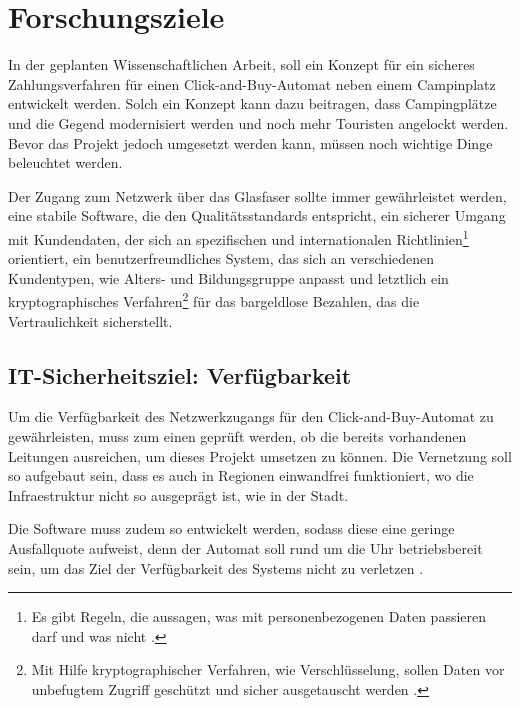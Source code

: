 \section{Forschungsziele}


In der geplanten Wissenschaftlichen Arbeit, soll ein Konzept für ein sicheres Zahlungsverfahren 
für einen Click-and-Buy-Automat neben einem Campinplatz entwickelt werden. Solch ein Konzept kann
dazu beitragen, dass Campingplätze und die Gegend modernisiert werden und noch mehr Touristen 
angelockt werden. Bevor das Projekt jedoch umgesetzt werden kann, müssen noch wichtige Dinge 
beleuchtet werden. 


Der Zugang zum Netzwerk über das Glasfaser sollte immer gewährleistet werden, eine stabile Software, die 
den Qualitätsstandards entspricht, ein sicherer Umgang mit Kundendaten, der sich an spezifischen und
internationalen Richtlinien\footnote{Es gibt Regeln, die aussagen, was mit personenbezogenen Daten passieren
darf und was nicht \cite{refart:DSDS}.} orientiert, ein benutzerfreundliches System, das sich an verschiedenen 
Kundentypen, wie Alters- und Bildungsgruppe anpasst und letztlich ein kryptographisches Verfahren\footnote{Mit
Hilfe kryptographischer Verfahren, wie Verschlüsselung, sollen Daten vor unbefugtem Zugriff geschützt und sicher 
ausgetauscht werden \cite{refart:SLWK}.} für das bargeldlose Bezahlen, das die Vertraulichkeit sicherstellt.


\subsection{IT-Sicherheitsziel: Verfügbarkeit}
Um die Verfügbarkeit des Netzwerkzugangs für den Click-and-Buy-Automat zu gewährleisten, muss zum einen 
geprüft werden, ob die bereits vorhandenen Leitungen ausreichen, um dieses Projekt umsetzen zu können.
Die Vernetzung soll so aufgebaut sein, dass es auch in Regionen einwandfrei funktioniert, wo die
Infraestruktur nicht so ausgeprägt ist, wie in der Stadt. 


Die Software muss zudem so entwickelt werden, sodass diese eine geringe Ausfallquote aufweist, denn der
Automat soll rund um die Uhr betriebsbereit sein, um das Ziel der Verfügbarkeit des Systems nicht zu 
verletzen \cite{refbook:SWIS}.

